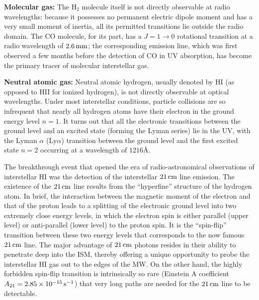\documentclass[a4paper,10pt]{article}
\begin{document}
{\noindent}\textbf{Molecular gas:} The H$_2$ molecule itself is not directly observable at radio wavelengths: because it possesses no permanent electric dipole moment and has a very small moment of inertia, all its permitted transitions lie outside the radio domain. The CO molecule, for its part, has a $J=1\rightarrow0$ rotational transition at a radio wavelength of $2.6\,{\rm mm}$; the corresponding emission line, which was first observed a few months before the detection of CO in UV absorption, has become the primary tracer of molecular interstellar gas.

{\noindent}\textbf{Neutral atomic gas:} Neutral atomic hydrogen, usually denoted by HI (as opposed to HII for ionized hydrogen), is not directly observable at optical wavelengths. Under most interstellar conditions, particle collisions are so infrequent that nearly all hydrogen atoms have their electron in the ground energy level $n=1$. It turns out that all the electronic transitions between the ground level and an excited state (forming the Lyman series) lie in the UV, with the Lyman $\alpha$ (Ly$\alpha$) transition between the ground level and the first excited state $n=2$ occurring at a wavelength of $1216$\AA.

{\noindent}The breakthrough event that opened the era of radio-astronomical observations of interstellar HI was the detection of the interstellar $21\,{\rm cm}$ line emission. The existence of the $21\,{\rm cm}$ line results from the ``hyperfine'' structure of the hydrogen atom. In brief, the interaction between the magnetic moment of the electron and that of the proton leads to a splitting of the electronic ground level into two extremely close energy levels, in which the electron spin is either parallel (upper level) or anti-parallel (lower level) to the proton spin. It is the ``spin-flip'' transition between these two energy levels that corresponds to the now famous $21\,{\rm cm}$ line. The major advantage of $21\,{\rm cm}$ photons resides in their ability to penetrate deep into the ISM, thereby offering a unique opportunity to probe the interstellar HI gas out to the edges of the MW. On the other hand, the highly forbidden spin-flip transition is intrinsically so rare (Einstein A coefficient $A_{21}=2.85\times10^{-15}\,{\rm s^{-1}}$) that very long paths are needed for the $21\,{\rm cm}$ line to be detectable.
\end{document}
